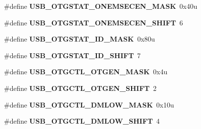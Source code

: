 \begin{DoxyCompactItemize}
\item 
\#define {\bfseries U\+S\+B\+\_\+\+O\+T\+G\+S\+T\+A\+T\+\_\+\+O\+N\+E\+M\+S\+E\+C\+E\+N\+\_\+\+M\+A\+SK}~0x40u\hypertarget{group__USB__Register__Masks_gaf29778bce4dce2841774778e5c566bf5}{}\label{group__USB__Register__Masks_gaf29778bce4dce2841774778e5c566bf5}

\item 
\#define {\bfseries U\+S\+B\+\_\+\+O\+T\+G\+S\+T\+A\+T\+\_\+\+O\+N\+E\+M\+S\+E\+C\+E\+N\+\_\+\+S\+H\+I\+FT}~6\hypertarget{group__USB__Register__Masks_gaac9cb5de36e29af8366533e2c05c31ac}{}\label{group__USB__Register__Masks_gaac9cb5de36e29af8366533e2c05c31ac}

\item 
\#define {\bfseries U\+S\+B\+\_\+\+O\+T\+G\+S\+T\+A\+T\+\_\+\+I\+D\+\_\+\+M\+A\+SK}~0x80u\hypertarget{group__USB__Register__Masks_gab1f78fae0de86d5ced423f41f9d6b098}{}\label{group__USB__Register__Masks_gab1f78fae0de86d5ced423f41f9d6b098}

\item 
\#define {\bfseries U\+S\+B\+\_\+\+O\+T\+G\+S\+T\+A\+T\+\_\+\+I\+D\+\_\+\+S\+H\+I\+FT}~7\hypertarget{group__USB__Register__Masks_ga4f674a8a6d13daeb25950cb78cfa625c}{}\label{group__USB__Register__Masks_ga4f674a8a6d13daeb25950cb78cfa625c}

\item 
\#define {\bfseries U\+S\+B\+\_\+\+O\+T\+G\+C\+T\+L\+\_\+\+O\+T\+G\+E\+N\+\_\+\+M\+A\+SK}~0x4u\hypertarget{group__USB__Register__Masks_ga6cdb9b59615dfc774914e37d44f17e3a}{}\label{group__USB__Register__Masks_ga6cdb9b59615dfc774914e37d44f17e3a}

\item 
\#define {\bfseries U\+S\+B\+\_\+\+O\+T\+G\+C\+T\+L\+\_\+\+O\+T\+G\+E\+N\+\_\+\+S\+H\+I\+FT}~2\hypertarget{group__USB__Register__Masks_ga45ccee22440e024d6e6096d5607372f6}{}\label{group__USB__Register__Masks_ga45ccee22440e024d6e6096d5607372f6}

\item 
\#define {\bfseries U\+S\+B\+\_\+\+O\+T\+G\+C\+T\+L\+\_\+\+D\+M\+L\+O\+W\+\_\+\+M\+A\+SK}~0x10u\hypertarget{group__USB__Register__Masks_ga929467feea7b1506c205dd78112a8a98}{}\label{group__USB__Register__Masks_ga929467feea7b1506c205dd78112a8a98}

\item 
\#define {\bfseries U\+S\+B\+\_\+\+O\+T\+G\+C\+T\+L\+\_\+\+D\+M\+L\+O\+W\+\_\+\+S\+H\+I\+FT}~4\hypertarget{group__USB__Register__Masks_ga11854093d47631b4f11f0c50bf7a063f}{}\label{group__USB__Register__Masks_ga11854093d47631b4f11f0c50bf7a063f}


\end{DoxyCompactItemize}
